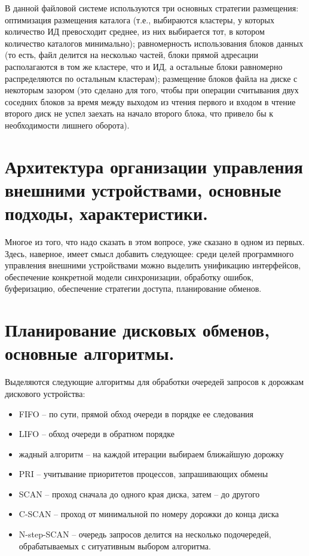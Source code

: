 \documentclass[a4paper,12pt,titlepage,finall]{article}
\begin{document}
В  данной файловой системе используются три основных стратегии размещения: оптимизация размещения каталога (т.е., выбираются кластеры, у которых количество ИД превосходит среднее, из них выбирается тот, в котором количество каталогов минимально); равномерность использования блоков данных (то есть, файл делится на несколько частей, блоки прямой адресации располагаются в том же кластере, что и ИД, а остальные блоки равномерно распределяются по остальным кластерам); размещение блоков файла на диске с некоторым зазором (это сделано для того, чтобы при операции считывания двух соседних блоков за время между выходом из чтения первого и входом в чтение второго диск не успел заехать на начало второго блока, что привело бы к необходимости лишнего оборота).

\section{Архитектура организации управления внешними
устройствами, основные подходы, характеристики.}
Многое из того, что надо сказать в этом вопросе, уже сказано в одном из первых. Здесь, наверное, имеет смысл добавить следующее: среди целей программного управления внешними устройствами можно выделить унификацию интерфейсов, обеспечение конкретной модели синхронизации, обработку ошибок, буферизацию, обеспечение стратегии доступа, планирование обменов.

\section{Планирование дисковых обменов, основные алгоритмы.}
Выделяются следующие алгоритмы для обработки очередей запросов к дорожкам дискового устройства:
\begin{itemize}
    \item FIFO -- по сути, прямой обход очереди в порядке ее следования
    \item LIFO -- обход очереди в обратном порядке
    \item жадный алгоритм -- на каждой итерации выбираем ближайшую дорожку
    \item PRI -- учитывание приоритетов процессов, запрашивающих обмены
    \item SCAN -- проход сначала до одного края диска, затем -- до другого
    \item C-SCAN -- проход от минимальной по номеру дорожки до конца диска
    \item N-step-SCAN -- очередь запросов делится на несколько подочередей, обрабатываемых с ситуативным выбором алгоритма.
\end{itemize}
\end{document}
